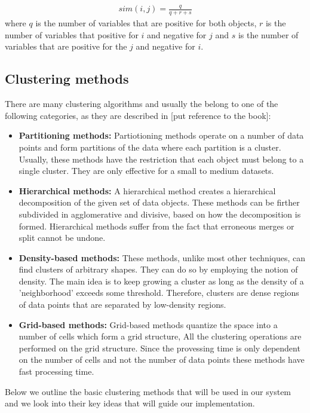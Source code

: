 \begin{eqnarray}
sim(i,j) = \frac{q}{q + r + s}  
\end{eqnarray} 
where $q$ is the number of variables that are positive for both objects, $r$ is the number of variables that positive for $i$ and negative for $j$ and $s$ is the  number of variables that are positive for the $j$ and negative for $i$.


\subsection{Clustering methods}
There are many clustering algorithms and usually the belong to one of the following categories, as they are described in [put reference to the book]:

\begin{itemize}
 \item \textbf{Partitioning methods:} Partiotioning methods operate on a number of data points and form partitions of the data where each partition is a cluster. Usually, these methods have the restriction that each object must belong to a single cluster. They are only effective for a small to medium datasets. 
 \item \textbf{Hierarchical methods:} A hierarchical method creates a hierarchical decomposition of the given set of data objects. These methods can be firther subdivided 
 in agglomerative and divisive, based on how the decomposition is formed. Hierarchical methods suffer from the fact that erroneous merges or split cannot be undone. 
 \item \textbf{Density-based methods:} These methods, unlike most other techniques, can find clusters of arbitrary shapes. They can do so by employing the notion of density. The
 main idea is to keep growing a cluster as long as the density of a 'neighborhood' exceeds some threshold. Therefore, clusters are dense regions of data points that are separated 
 by low-density regions.
 \item \textbf{Grid-based methods:} Grid-based methods quantize the space into a number of cells which form a grid structure, All the clustering operations are performed on the grid structure. Since the provessing time is only dependent on the number of cells and not the number of data points these methods have fast processing time. 
\end{itemize}\vspace{15pt}

Below we outline the basic clustering methods that will be used in our system and we look into their key ideas that will guide 
our implementation. 

